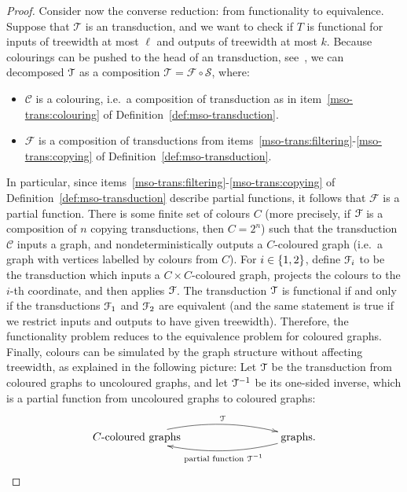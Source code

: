 \begin{proof}
    Consider now the converse reduction: from functionality to equivalence. Suppose that $\mathcal T$ is an \mso transduction, and we want to check if $T$ is functional for inputs of treewidth at most $\ell$ and outputs of treewidth at most $k$. Because colourings can be pushed to the head of an \mso transduction, see~\cite[Section 1.7]{courcelleGraphStructureMonadic2012}, we can decomposed ${\mathcal T}$ as a  composition $\mathcal T =  \mathcal F \circ \mathcal S$, where:
    \begin{itemize}
        \item $\mathcal C$ is a colouring, i.e.~a composition of transduction as in item~\ref{mso-trans:colouring} of Definition~\ref{def:mso-transduction}.
        \item $\mathcal F$ is a composition of transductions from items~\ref{mso-trans:filtering}-\ref{mso-trans:copying} of Definition~\ref{def:mso-transduction}.
    \end{itemize}
    In particular, since items~\ref{mso-trans:filtering}-\ref{mso-trans:copying} of Definition~\ref{def:mso-transduction} describe partial functions, it follows that $\mathcal F$ is a partial function. There is some finite set of colours $C$ (more precisely, if ${\mathcal F}$ is a composition of $n$ copying transductions, then $C=2^n$) such that the  transduction $\mathcal C$ inputs a graph, and nondeterministically outputs a $C$-coloured graph (i.e.~a graph with vertices labelled by colours from $C$). For $i  \in \{1,2\}$, define ${\mathcal F}_i$ to be the \mso transduction which inputs a $C \times C$-coloured  graph, projects the colours to the $i$-th coordinate, and then applies ${\mathcal F}$. The transduction ${\mathcal T}$ is functional if and only if the transductions ${\mathcal F}_1$ and ${\mathcal F}_2$ are equivalent (and the same statement is true if we restrict inputs and outputs to have given treewidth). Therefore, the functionality problem reduces to the equivalence problem for coloured graphs. Finally, colours can be simulated by the graph structure without affecting treewidth,  as explained in the following picture:
    Let ${\mathcal T}$ be the \mso transduction from coloured graphs to uncoloured graphs, and let ${\mathcal T}^{-1}$ be its one-sided inverse, which is a partial function from uncoloured graphs to coloured graphs:
    \begin{align*}
        \xymatrix@C=3cm{
            \text{$C$-coloured graphs}
            \ar@/^1pc/[r]^-{\Tt} &
            \text{graphs}.
            \ar@/^1pc/[l]^-{\text{partial function }\Tt^{-1}}
        }
        \end{align*}

\end{proof}
